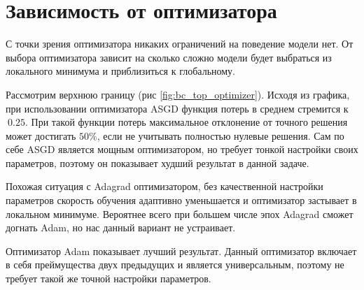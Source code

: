 \section{Зависимость от оптимизатора}

С точки зрения оптимизатора никаких ограничений на поведение
модели нет. От выбора оптимизатора зависит на сколько сложно
модели будет выбраться из локального минимума и приблизиться
к глобальному.

Рассмотрим верхнюю границу (рис \ref{fig:bc_top_optimizer}).
Исходя из графика, при использовании оптимизатора ASGD
функция потерь в среднем стремится к $~0.25$. При такой 
функции потерь максимальное отклонение от точного решения
может достигать $50\%$, если не учитывать полностью
нулевые решения. Сам по себе ASGD является мощным оптимизатором,
но требует тонкой настройки своих параметров, поэтому он
показывает худший результат в данной задаче.

Похожая ситуация с Adagrad оптимизатором, без качественной
настройки параметров скорость обучения адаптивно уменьшается
и оптимизатор застывает в локальном минимуме. Вероятнее всего
при большем числе эпох Adagrad сможет догнать Adam, но нас
данный вариант не устраивает.

Оптимизатор Adam показывает лучший результат. Данный оптимизатор
включает в себя преймущества двух предыдущих и является универсальным,
поэтому не требует такой же точной настройки параметров.

